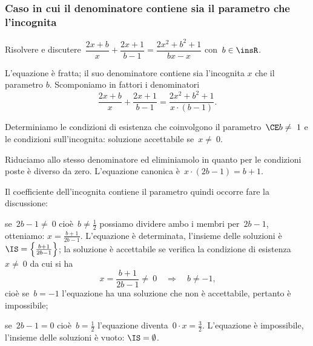 
\subsubsection{Caso in cui il denominatore contiene sia il parametro che l’incognita}

\begin{exrig}
 \begin{esempio}
Risolvere e discutere~$\dfrac{2x+b}{x}+\dfrac{2x+1}{b-1}=\dfrac{2x^{2}+b^{2}+1}{bx-x}$ con~$b\in \insR$.
\end{esempio}
L’equazione è fratta; il suo denominatore contiene sia l’incognita $x$ che il parametro $b$.
Scomponiamo in fattori i denominatori
\[\frac{2x+b}{x}+\frac{2x+1}{b-1}=\frac{2x^{2}+b^{2}+1}{x\cdot (b-1)}.\]

Determiniamo le condizioni di esistenza che coinvolgono il parametro~$\CE b\neq~1$ e
le condizioni sull’incognita: soluzione accettabile se~$x\neq~0$.

Riduciamo allo stesso denominatore ed eliminiamolo in quanto per le condizioni poste è diverso da zero.
L'equazione canonica è~$x\cdot (2b-1)=b+1.$

Il coefficiente dell’incognita contiene il parametro quindi occorre fare la discussione:

\begin{enumeratea}
 \item se~$2b-1\neq~0$ cioè~$b\neq \frac{1}{2}$ possiamo dividere ambo i membri per~$2b-1$, otteniamo:
    $x=\frac{b+1}{2b-1}$. L’equazione è determinata, l'insieme delle soluzioni è~$\IS=\left\{\frac{b+1}{2b-1}\right\}$;
    la soluzione è accettabile se verifica la condizione di esistenza~$x\neq~0$ da cui si ha
    \[x=\frac{b+1}{2b-1}\neq~0\quad \Rightarrow\quad b\neq -1\text{,}\]
    cioè se~$b=-1$ l'equazione ha una soluzione che non è accettabile, pertanto è impossibile;
 \item se~$2b-1=0$ cioè~$b=\frac{1}{2}$ l’equazione diventa~$0\cdot x=\frac{3}{2}$. L’equazione è impossibile, l'insieme delle soluzioni è vuoto:
    $\IS=\emptyset$.
\end{enumeratea}


\end{exrig}
